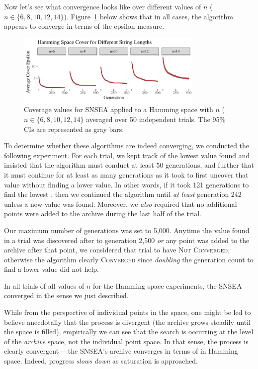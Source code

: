 \documentclass[twoside]{article}
\begin{document}
Now let's see what  convergence looks like over different values of $n$ ($n\in\{6, 8, 10, 12, 14\}$).  Figure~\ref{fig:hamming:nopop:sm} below shows that in all cases, the algorithm appears to converge in terms of the  epsilon measure.
%
\begin{figure}[h]
  \center\includegraphics[width=0.8\textwidth]{Figures/hamming-500sm-NOPOP.pdf}
  \caption{\label{fig:hamming:nopop:sm} Coverage values for SNSEA applied to a Hamming space with $n$ ($n\in\{6, 8, 10, 12, 14\}$ averaged over 50 independent trials.  The 95\% CIs are represented as gray bars.}
\end{figure}

To determine whether these algorithms are indeed converging, we conducted the following experiment.  For each trial, we kept track of the lowest  value found and insisted that the algorithm must conduct at least 50 generations, and further that it must continue for at least as many generations as it took to first uncover that value without finding a lower value.  In other words, if it took 121 generations to find the lowest , then we continued the algorithm until \emph{at least} generation 242 unless a new  value was found.  Moreover, we \emph{also} required that no additional points were added to the archive during the last half of the trial.

Our maximum number of generations was set to 5,000.  Anytime the  value found in a trial was discovered after to generation 2,500 \emph{or} any point was added to the archive after that point, we considered that trial to have \textsc{Not Converged}, otherwise the algorithm clearly \textsc{Converged} since \emph{doubling} the generation count to find a lower value did not help.  

In all trials of all values of $n$  for the Hamming space experiments, the SNSEA converged in the sense we just described.

While from the perspective of individual points in the space, one might be led to believe anecdotally that the process is divergent (the archive grows steadily until the space is filled), empirically we can see that the search is occurring at the level of the \emph{archive} space, not the individual point space.  In that sense, the process is clearly convergent\,---\,the SNSEA's archive converges in terms of \emph{} in Hamming space.  Indeed, progress \emph{slows down} as saturation is approached.
\end{document}
